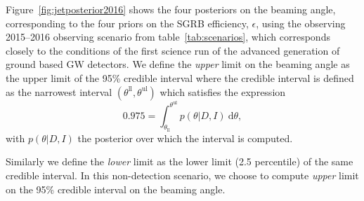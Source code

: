 \documentclass[twocolumn,nofootinbib]{revtex4-1}
\newcommand{\cbcrate}{{{\mathcal R}}}
\newcommand{\diff}{{\mathrm d}}
\newcommand{\rhostar}{{\rho^*}}
\begin{document}
%
%
%


Figure~\ref{fig:jetposterior2016} shows the four posteriors on the
beaming angle, corresponding to the four priors on the \ac{SGRB}
efficiency, $\epsilon$, using the observing 2015--2016 observing
scenario from table~\ref{tab:scenarios}, which corresponds closely
to the conditions of the first science run of the advanced generation
of ground based \ac{GW} detectors.  We define the \emph{upper} limit
on the beaming angle as the upper limit of the 95\% credible interval
where the credible interval is defined as the narrowest interval
$(\theta^{\mathrm{ll}}, \theta^{\mathrm{ul}})$ which satisfies the expression
\begin{equation}
    \label{eq:beaming_upper_limit}
    0.975 = \int_{\theta_{\mathrm{ll}}}^{\theta^{\mathrm{ul}}} p(\theta|D,I)~\diff \theta,
\end{equation}
with $p(\theta|D,I)$ the posterior over which the interval is
computed.

Similarly we define the \emph{lower} limit as the lower
limit (2.5 percentile) of the same credible interval.  In this
non-detection scenario, we choose to compute \emph{upper} limit on the
95\% credible interval on the beaming angle.
\end{document}
